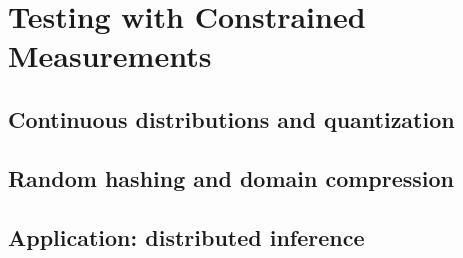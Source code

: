 \documentclass[biber]{nowfnt} %
\begin{document}
\chapter{Testing with Constrained Measurements}
  \label{chap:constrained}
\section{Continuous distributions and quantization}
\section{Random hashing and domain compression}
  \label{sec:domain:compression}
\section{Application: distributed inference}

%
%
%
%
\end{document}

